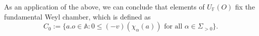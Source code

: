 \documentclass[12pt]{amsart}
\newcommand{\F}{\mathbb{F} }
\newcommand{\frakg}{\mathfrak{g}}
\newcommand{\A}{\mathbb{A}}
\numberwithin{equation}{section}
\theoremstyle{remark} %
\begin{document}
%	
As an application of the above, we can conclude that elements of $U_\F(O)$ fix the fundamental Weyl chamber, which is defined as 
$$
C_0 := \{a.o \in \A \colon 0 \leq (-v)(\chi_\alpha (a)) \text{ for all }\alpha \in \Sigma_{>0} \}.
$$
\end{document}
